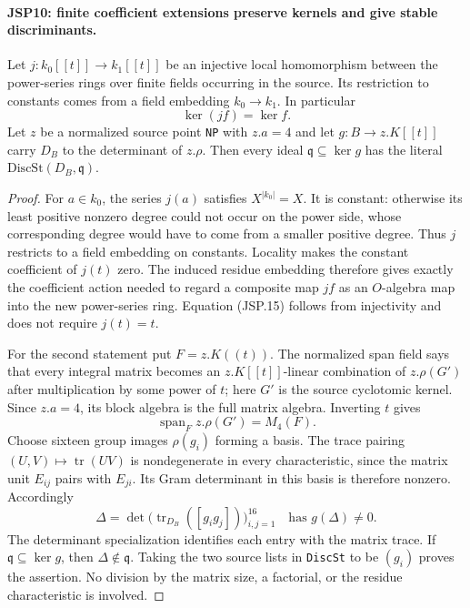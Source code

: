 \paragraph{JSP10: finite coefficient extensions preserve kernels and give stable discriminants.}
\label{claim:JSP10}
Let $j:k_0[[t]]\to k_1[[t]]$ be an injective local homomorphism
between the power-series rings over finite fields occurring in
the source. Its restriction to constants comes from a field
embedding $k_0\to k_1$. In particular
\[
                      \ker(jf)=\ker f.               \tag{JSP.15}
\]
Let $z$ be a normalized source point \texttt{NP} with
$z.a=4$ and let $g:B\to z.K[[t]]$ carry $D_B$ to the
determinant of $z.\rho$. Then every ideal
$\mathfrak q\subseteq\ker g$ has the literal
$\mathrm{DiscSt}(D_B,\mathfrak q)$.
\begin{proof}
For $a\in k_0$, the series $j(a)$ satisfies $X^{|k_0|}=X$.
It is constant: otherwise its least positive nonzero degree
could not occur on the power side, whose corresponding degree
would have to come from a smaller positive degree. Thus $j$
restricts to a field embedding on constants. Locality makes
the constant coefficient of $j(t)$ zero. The induced residue
embedding therefore gives exactly the coefficient action needed
to regard a composite map $jf$ as an $O$-algebra map into the
new power-series ring. Equation (JSP.15) follows from
injectivity and does not require $j(t)=t$.

For the second statement put $F=z.K((t))$.
The normalized span field says that every integral matrix
becomes an $z.K[[t]]$-linear combination of $z.\rho(G')$
after multiplication by some power of $t$; here $G'$ is the
source cyclotomic kernel. Since $z.a=4$, its block algebra
is the full matrix algebra. Inverting $t$ gives
\[
          \operatorname{span}_F z.\rho(G')=M_4(F).
\]
Choose sixteen group images $\rho(g_i)$ forming a basis.
The trace pairing $(U,V)\mapsto\operatorname{tr}(UV)$ is
nondegenerate in every characteristic, since the matrix unit
$E_{ij}$ pairs with $E_{ji}$. Its Gram determinant in this
basis is therefore nonzero. Accordingly
\[
 \Delta=\det\bigl(\operatorname{tr}_{D_B}([g_i g_j])\bigr)_{i,j=1}^{16}
                 \quad\text{has }g(\Delta)\ne0.       \tag{JSP.16}
\]
The determinant specialization identifies each entry with the
matrix trace. If $\mathfrak q\subseteq\ker g$, then
$\Delta\notin\mathfrak q$. Taking the two source lists in
\texttt{DiscSt} to be $(g_i)$ proves the assertion. No division
by the matrix size, a factorial, or the residue characteristic
is involved.
\end{proof}

